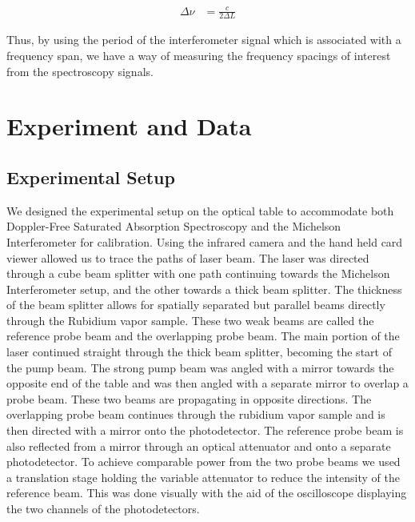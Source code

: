 \documentclass[12pt]{article}
\begin{document}
\begin{align}
	\Delta \nu &= \frac{c}{2 \Delta L}\label{eq:interferometer}
\end{align}

Thus, by using the period of the interferometer signal which is associated with a frequency span, we have a way of measuring the frequency spacings of interest from the spectroscopy signals.

\section*{Experiment and Data}

\subsection*{Experimental Setup}
We designed the experimental setup on the optical table to accommodate both Doppler-Free Saturated Absorption Spectroscopy and the Michelson Interferometer for calibration.  Using the infrared camera and the hand held card viewer allowed us to trace the paths of laser beam. The laser was directed through a cube beam splitter with one path continuing towards the Michelson Interferometer setup, and the other towards a thick beam splitter. The thickness of the beam splitter allows for spatially separated but parallel beams directly through the Rubidium vapor sample. These two weak beams are called the reference probe beam and the overlapping probe beam. The main portion of the laser continued straight through the thick beam splitter, becoming the start of the pump beam. The strong pump beam was angled with a mirror towards the opposite end of the table and was then angled with a separate mirror to overlap a probe beam. These two beams are propagating in opposite directions. The overlapping probe beam continues through the rubidium vapor sample and is then directed with a mirror onto the photodetector. The reference probe beam is also reflected from a mirror through an optical attenuator and onto a separate photodetector. To achieve comparable power from the two probe beams we used a translation stage holding the variable attenuator to reduce the intensity of the reference beam. This was done visually with the aid of the oscilloscope  displaying the two channels of the photodetectors. 
\end{document}
